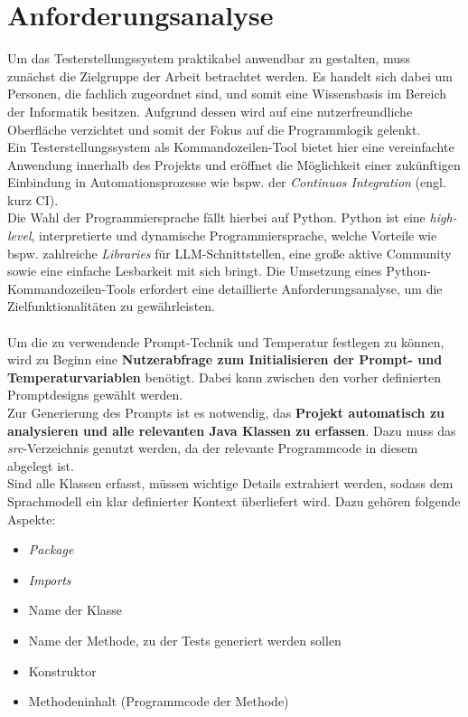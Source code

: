 \section{Anforderungsanalyse}\label{section:anford}
Um das Testerstellungssystem praktikabel anwendbar zu gestalten, muss zunächst die Zielgruppe der Arbeit betrachtet werden. Es handelt sich dabei um Personen, die fachlich zugeordnet sind, und somit eine Wissensbasis im Bereich der Informatik besitzen. Aufgrund dessen wird auf eine nutzerfreundliche Oberfläche verzichtet und somit der Fokus auf die Programmlogik gelenkt.\\ Ein Testerstellungssystem als Kommandozeilen-Tool bietet hier eine vereinfachte Anwendung innerhalb des Projekts und eröffnet die Möglichkeit einer zukünftigen Einbindung in Automationsprozesse wie bspw. der \textit{Continuos Integration} (engl. kurz CI).\\ Die Wahl der Programmiersprache fällt hierbei auf Python. Python ist eine \textit{high-level}, interpretierte und dynamische Programmiersprache, welche Vorteile wie bspw. zahlreiche \textit{Libraries} für LLM-Schnittstellen, eine große aktive Community sowie eine einfache Lesbarkeit mit sich bringt. \cite*{PythonLanguageAdvantages2017} Die Umsetzung eines Python-Kommandozeilen-Tools erfordert eine detaillierte Anforderungsanalyse, um die Zielfunktionalitäten zu gewährleisten.\\\\
Um die zu verwendende Prompt-Technik und Temperatur festlegen zu können, wird zu Beginn eine \textbf{Nutzerabfrage zum Initialisieren der Prompt- und Temperaturvariablen} benötigt. Dabei kann zwischen den vorher definierten Promptdesigns gewählt werden. \\ Zur Generierung des Prompts ist es notwendig, das \textbf{Projekt automatisch zu analysieren und alle relevanten Java Klassen zu erfassen}. Dazu muss das \textit{src}-Verzeichnis genutzt werden, da der relevante Programmcode in diesem abgelegt ist.\\ Sind alle Klassen erfasst, müssen wichtige Details extrahiert werden, sodass dem Sprachmodell ein klar definierter Kontext überliefert wird. Dazu gehören folgende Aspekte:
\begin{itemize}
    \setlength{\parskip}{1pt}
    \item \textit{Package}
    \item \textit{Imports}
    \item Name der Klasse
    \item Name der Methode, zu der Tests generiert werden sollen
    \item Konstruktor
    \item Methodeninhalt (Programmcode der Methode)
\end{itemize}
